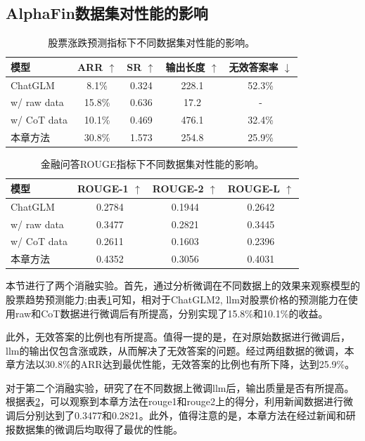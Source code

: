 \subsection{AlphaFin数据集对性能的影响}

\begin{table}
	\caption{\label{dataset_ablation_trend}股票涨跌预测指标下不同数据集对性能的影响。}
	\centering{}%
	\small 
	\begin{tabular}{lcccc}
		\toprule[2pt]
		模型 & ARR $\uparrow$ & SR $\uparrow$ & 输出长度 $\uparrow$ & 无效答案率 $\downarrow$ \\
		\hline
		ChatGLM & 8.1\% & 0.324 & 228.1 & 52.3\% \\
		w/ raw data & 15.8\% & 0.636 & 17.2 & - \\
		w/ CoT data & 10.1\% & 0.469 & 476.1 & 32.4\% \\
		本章方法 & 30.8\% & 1.573 & 254.8 & 25.9\% \\
		\bottomrule[2pt]
	\end{tabular}
\end{table}

\begin{table}
	\caption{\label{dataset_ablation_qa}金融问答ROUGE指标下不同数据集对性能的影响。}
	\centering{}%
	\small 
	\begin{tabular}{lccc}
		\toprule[2pt]
		模型 & ROUGE-1 $\uparrow$ & ROUGE-2 $\uparrow$ & ROUGE-L $\uparrow$ \\
		\hline
		ChatGLM & 0.2784 & 0.1944 & 0.2642 \\
		w/ raw data & 0.3477 & 0.2821 & 0.3445 \\
		w/ CoT data & 0.2611 & 0.1603 & 0.2396 \\
		本章方法 & 0.4352 & 0.3056 & 0.4031 \\
		\bottomrule[2pt]
	\end{tabular}
\end{table}

本节进行了两个消融实验。首先，通过分析微调在不同数据上的效果来观察模型的股票趋势预测能力;由表\ref{dataset_ablation_trend}可知，相对于ChatGLM2, llm对股票价格的预测能力在使用raw和CoT数据进行微调后有所提高，分别实现了15.8\%和10.1\%的收益。 

此外，无效答案的比例也有所提高。值得一提的是，在对原始数据进行微调后，llm的输出仅包含涨或跌，从而解决了无效答案的问题。经过两组数据的微调，本章方法以30.8\%的ARR达到最优性能，无效答案的比例也有所下降，达到25.9\%。

对于第二个消融实验，研究了在不同数据上微调llm后，输出质量是否有所提高。根据表\ref{dataset_ablation_qa}，可以观察到本章方法在rouge1和rouge2上的得分，利用新闻数据进行微调后分别达到了0.3477和0.2821。此外，值得注意的是，本章方法在经过新闻和研报数据集的微调后均取得了最优的性能。

